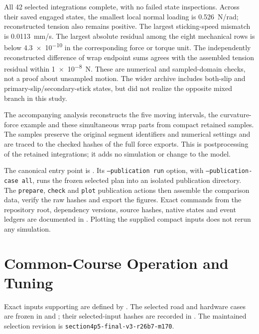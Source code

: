 \documentclass[11pt]{report}
\numberwithin{equation}{section}
\begin{document}
All 42 selected integrations complete, with no failed state inspections.
Across their saved engaged states, the smallest local normal loading is
\SI{0.526}{N/rad}; reconstructed tension also remains positive. The largest
sticking-speed mismatch is \SI{0.0113}{mm/s}. The largest absolute residual
among the eight mechanical rows is below \num{4.3e-10} in the corresponding
force or torque unit. The independently reconstructed difference of wrap
endpoint sums agrees with the assembled tension residual within
\SI{1e-8}{N}. These are numerical and sampled-domain checks, not a proof
about unsampled motion. The wider archive includes both-slip and
primary-slip/secondary-stick states, but did not realize the opposite mixed
branch in this study.

The accompanying analysis
 reconstructs the five moving
intervals, the curvature-force example and these simultaneous wrap parts
from compact retained samples. The samples preserve the original segment
identifiers and numerical settings and are traced to the checked hashes
of the full force exports. This is postprocessing of the retained
integrations; it adds no simulation or change to the model.

The canonical entry point is . Its
\texttt{--publication run} option, with \texttt{--publication-case all},
runs the frozen selected plan into an isolated publication directory.
The \texttt{prepare}, \texttt{check} and \texttt{plot} publication actions
then assemble the comparison data, verify the raw hashes and export the
figures. Exact commands from the repository root, dependency versions,
source hashes, native states and event ledgers are documented in
. Plotting the supplied compact inputs
does not rerun any simulation.
\FloatBarrier

\section{Common-Course Operation and Tuning}
\label{app:study_course_tuning}

Exact inputs supporting  are defined by
. The selected road
and hardware cases are frozen in
 and
;
their selected-input hashes are recorded in
.
The maintained selection revision is
\texttt{section4p5-final-v3-r26b7-m170}.
\end{document}
